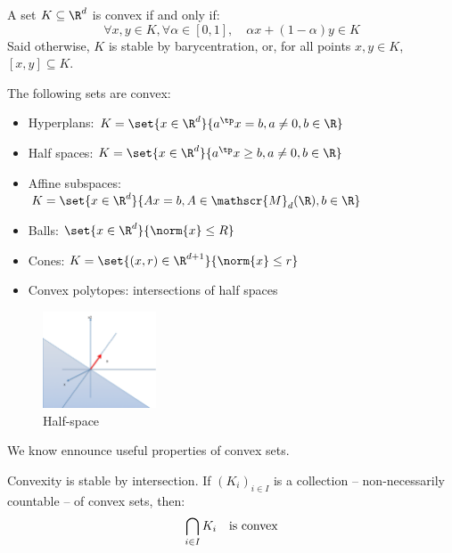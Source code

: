 \documentclass[toc, titlepaged]{../cs-classes/cs-classes}
\begin{document}
\begin{definition}
    A set $K\subseteq\R^d$ is convex if and only if:
    \begin{equation*}
        \forall x, y\in K, \forall \alpha\in[0, 1], \quad \alpha x+(1-\alpha)y \in K
    \end{equation*}
    Said otherwise, $K$ is stable by barycentration, or, for all points $x, y\in K$, $[x, y]\subseteq K$.
\end{definition}

\begin{example}
    The following sets are convex:
    \begin{itemize}
        \item Hyperplans: $K=\set{x\in\R^d}{a^\tp x = b, a\neq 0, b\in\R}$
        \item Half spaces: $K=\set{x\in\R^d}{a^\tp x\geq b, a\neq0, b\in\R}$
        \item Affine subspaces: $K=\set{x\in\R^d}{Ax=b, A\in\mathscr{M}_d(\R), b\in\R}$
        \item Balls: $\set{x\in\R^d}{\norm{x}\leq R}$
        \item Cones: $K=\set{(x, r)\in\R^{d+1}}{\norm{x}\leq r}$
        \item Convex polytopes: intersections of half spaces
    \end{itemize}
\end{example}

\begin{figure}
    \centering
        \captionsetup{justification=centering}
        \includegraphics[width=0.3\textwidth]{images/half-space.png}
        \caption{Half-space}
\end{figure}
We know ennounce useful properties of convex sets.
\begin{property}
    Convexity is stable by intersection. If $(K_i)_{i\in I}$ is a collection -- non-necessarily countable -- of convex sets, then:
    \begin{equation*}
        \bigcap_{i\in I}K_i \quad\textnormal{is convex}
    \end{equation*}
\end{property}
\end{document}
